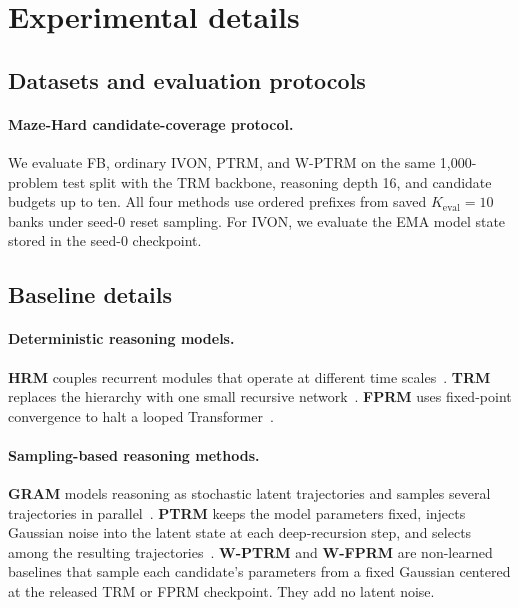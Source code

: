 \section{Experimental details}
\label{app:experimental-details}

\subsection{Datasets and evaluation protocols}


\paragraph{Maze-Hard candidate-coverage protocol.}
We evaluate FB, ordinary IVON, PTRM, and W-PTRM on the same 1,000-problem test
split with the TRM backbone, reasoning depth 16, and candidate budgets up to
ten. All four methods use ordered prefixes from saved
$K_{\mathrm{eval}}=10$ banks under seed-0 reset sampling. For IVON, we
evaluate the EMA model state stored in the seed-0 checkpoint.

\subsection{Baseline details}

\paragraph{Deterministic reasoning models.}
\textbf{HRM} couples recurrent modules that operate at different time
scales~\citep{wang2025hierarchical}. \textbf{TRM} replaces the hierarchy with
one small recursive network~\citep{jolicoeurmartineau2025trm}.
\textbf{FPRM} uses fixed-point convergence to halt a looped
Transformer~\citep{movahedi2026fixedpoint}.

\paragraph{Sampling-based reasoning methods.}
\textbf{GRAM} models reasoning as stochastic latent trajectories and samples
several trajectories in parallel~\citep{baek2026generative}. \textbf{PTRM}
keeps the model parameters fixed, injects Gaussian noise into the latent state
at each deep-recursion step, and selects among the resulting
trajectories~\citep{sghaier2026probabilistic}. \textbf{W-PTRM} and
\textbf{W-FPRM} are non-learned baselines that sample each candidate's
parameters from a fixed Gaussian centered at the released TRM or FPRM
checkpoint. They add no latent noise.

